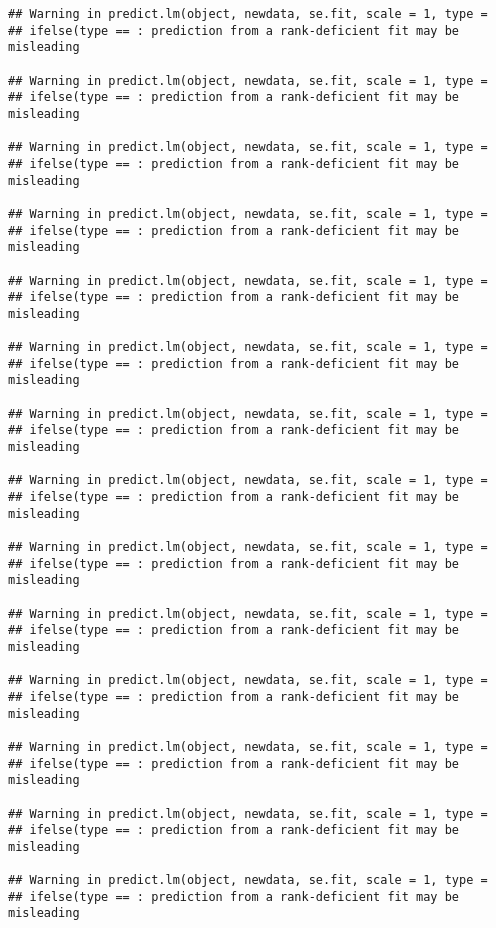 \documentclass[]{article}
\begin{document}
\begin{verbatim}
## Warning in predict.lm(object, newdata, se.fit, scale = 1, type =
## ifelse(type == : prediction from a rank-deficient fit may be misleading

## Warning in predict.lm(object, newdata, se.fit, scale = 1, type =
## ifelse(type == : prediction from a rank-deficient fit may be misleading

## Warning in predict.lm(object, newdata, se.fit, scale = 1, type =
## ifelse(type == : prediction from a rank-deficient fit may be misleading

## Warning in predict.lm(object, newdata, se.fit, scale = 1, type =
## ifelse(type == : prediction from a rank-deficient fit may be misleading

## Warning in predict.lm(object, newdata, se.fit, scale = 1, type =
## ifelse(type == : prediction from a rank-deficient fit may be misleading

## Warning in predict.lm(object, newdata, se.fit, scale = 1, type =
## ifelse(type == : prediction from a rank-deficient fit may be misleading

## Warning in predict.lm(object, newdata, se.fit, scale = 1, type =
## ifelse(type == : prediction from a rank-deficient fit may be misleading

## Warning in predict.lm(object, newdata, se.fit, scale = 1, type =
## ifelse(type == : prediction from a rank-deficient fit may be misleading

## Warning in predict.lm(object, newdata, se.fit, scale = 1, type =
## ifelse(type == : prediction from a rank-deficient fit may be misleading

## Warning in predict.lm(object, newdata, se.fit, scale = 1, type =
## ifelse(type == : prediction from a rank-deficient fit may be misleading

## Warning in predict.lm(object, newdata, se.fit, scale = 1, type =
## ifelse(type == : prediction from a rank-deficient fit may be misleading

## Warning in predict.lm(object, newdata, se.fit, scale = 1, type =
## ifelse(type == : prediction from a rank-deficient fit may be misleading

## Warning in predict.lm(object, newdata, se.fit, scale = 1, type =
## ifelse(type == : prediction from a rank-deficient fit may be misleading

## Warning in predict.lm(object, newdata, se.fit, scale = 1, type =
## ifelse(type == : prediction from a rank-deficient fit may be misleading


\end{verbatim}
\end{document}
